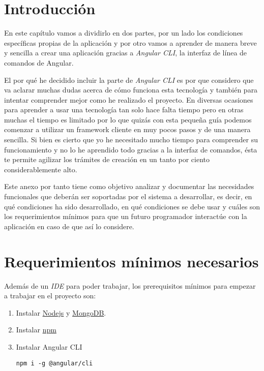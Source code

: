
\section{Introducción}\label{introduccion-programador}
En este capítulo vamos a dividirlo en dos partes, por un lado los condiciones específicas propias de la aplicación y por otro vamos a aprender de manera breve y sencilla a crear una aplicación gracias a \emph{Angular CLI}, la interfaz de línea de comandos de Angular.

El por qué he decidido incluir la parte de \emph{Angular CLI} es por que considero que va aclarar muchas dudas acerca de cómo funciona esta tecnología y también para intentar comprender mejor como he realizado el proyecto. En diversas ocasiones para aprender a usar una tecnología tan solo hace falta tiempo pero en otras muchas el tiempo es limitado por lo que quizás con esta pequeña guía podemos comenzar a utilizar un framework cliente en muy pocos pasos y de una manera sencilla. Si bien es cierto que yo he necesitado mucho tiempo para comprender su funcionamiento y no lo he aprendido todo gracias a la interfaz de comandos, ésta te permite agilizar los trámites de creación en un tanto por ciento considerablemente alto.

Este anexo por tanto tiene como objetivo analizar y documentar las necesidades funcionales que deberán ser soportadas por el sistema a desarrollar, es decir, en qué condiciones ha sido desarrollado, en qué condiciones se debe usar y cuáles son los requerimientos mínimos para que un futuro programador interactúe con la aplicación en caso de que así lo considere.

\section{Requerimientos mínimos necesarios}
Además de un \emph{IDE} para poder trabajar, los prerequisitos mínimos para empezar a trabajar en el proyecto son:

\begin{enumerate}
	\item Instalar \hyperlink{https://nodejs.org/en/}{Nodejs} y \hyperlink{https://www.mongodb.com/}{MongoDB}.
	\item Instalar \hyperlink{https://www.npmjs.com/}{npm}
	\item Instalar Angular CLI
		\lstset{language=C, breaklines=true, basicstyle=\footnotesize}
		\begin{lstlisting}[frame=single]
		npm i -g @angular/cli
    	\end{lstlisting}
\end{enumerate}

